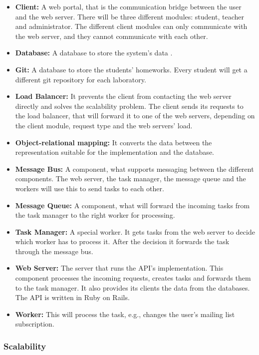 \begin{itemize}
	\item \textbf{Client:} A web portal, that is the communication bridge between the user and the web server. There will be three different modules: student, teacher and administrator. The different client modules can only communicate with the web server, and they cannot communicate with each other.
	\item \textbf{Database:} A database to store the system's data . 
	\item \textbf{Git:} A database to store the students' homeworks. Every student will get a different git repository for each laboratory.
	\item \textbf{Load Balancer:} It prevents the client from contacting the web server directly and solves the scalability problem. The client sends its requests to the load balancer, that will forward it to one of the web servers, depending on the client module, request type and the web servers' load.
	\item \textbf{Object-relational mapping:} It converts the data between the representation suitable for the implementation and the database. 
	\item \textbf{Message Bus:} A component, what supports messaging between the different components. The web server, the task manager, the message queue and the workers will use this to send tasks to each other.
	\item \textbf{Message Queue:} A component, what will forward the incoming tasks from the task manager to the right worker for processing. 
	\item \textbf{Task Manager:} A special worker. It gets tasks from the web server to decide which worker has to process it. After the decision it forwards the task through the message bus.
	\item \textbf{Web Server:} The server that runs the API's implementation. This component processes the incoming requests, creates tasks and forwards them to the task manager. It also provides its clients the data from the databases. The API is written in Ruby on Rails. 
	\item \textbf{Worker:} This will process the task, e.g., changes the user's mailing list subscription.
\end{itemize}

\newpage
\subsubsection{Scalability}

